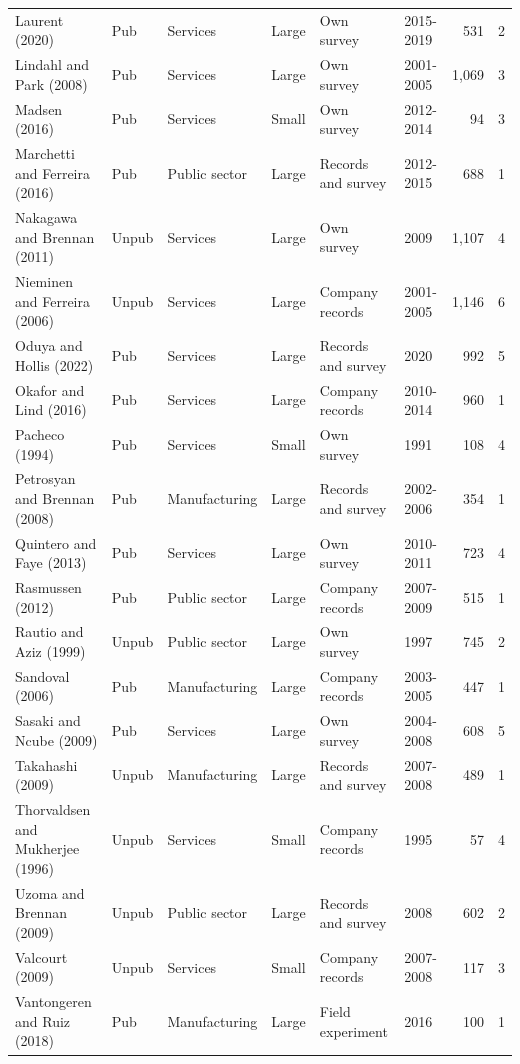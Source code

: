 \documentclass[11pt]{article}
\begin{document}
{\begin{longtable}{llllllrr}
Laurent (2020) & Pub & Services & Large & Own survey & 2015-2019 & 531 & 2 \\
Lindahl and Park (2008) & Pub & Services & Large & Own survey & 2001-2005 & 1,069 & 3 \\
Madsen (2016) & Pub & Services & Small & Own survey & 2012-2014 & 94 & 3 \\
Marchetti and Ferreira (2016) & Pub & Public sector & Large & Records and survey & 2012-2015 & 688 & 1 \\
Nakagawa and Brennan (2011) & Unpub & Services & Large & Own survey & 2009 & 1,107 & 4 \\
Nieminen and Ferreira (2006) & Unpub & Services & Large & Company records & 2001-2005 & 1,146 & 6 \\
Oduya and Hollis (2022) & Pub & Services & Large & Records and survey & 2020 & 992 & 5 \\
Okafor and Lind (2016) & Pub & Services & Large & Company records & 2010-2014 & 960 & 1 \\
Pacheco (1994) & Pub & Services & Small & Own survey & 1991 & 108 & 4 \\
Petrosyan and Brennan (2008) & Pub & Manufacturing & Large & Records and survey & 2002-2006 & 354 & 1 \\
Quintero and Faye (2013) & Pub & Services & Large & Own survey & 2010-2011 & 723 & 4 \\
Rasmussen (2012) & Pub & Public sector & Large & Company records & 2007-2009 & 515 & 1 \\
Rautio and Aziz (1999) & Unpub & Public sector & Large & Own survey & 1997 & 745 & 2 \\
Sandoval (2006) & Pub & Manufacturing & Large & Company records & 2003-2005 & 447 & 1 \\
Sasaki and Ncube (2009) & Pub & Services & Large & Own survey & 2004-2008 & 608 & 5 \\
Takahashi (2009) & Unpub & Manufacturing & Large & Records and survey & 2007-2008 & 489 & 1 \\
Thorvaldsen and Mukherjee (1996) & Unpub & Services & Small & Company records & 1995 & 57 & 4 \\
Uzoma and Brennan (2009) & Unpub & Public sector & Large & Records and survey & 2008 & 602 & 2 \\
Valcourt (2009) & Unpub & Services & Small & Company records & 2007-2008 & 117 & 3 \\
Vantongeren and Ruiz (2018) & Pub & Manufacturing & Large & Field experiment & 2016 & 100 & 1 \\

\end{longtable}}
\end{document}
